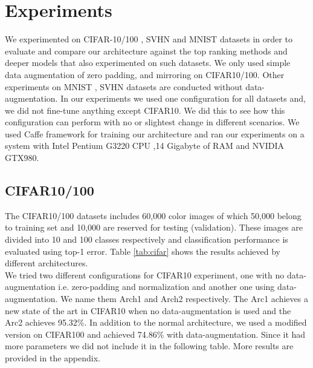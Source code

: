 \documentclass{article} \usepackage{lets_keepit_simple,times}
\begin{document}
\section{Experiments} \label{sec:exp}
We experimented on CIFAR-10/100 \cite{Krizhevsky_LearningMultipleLayers_2009}, SVHN \cite{Netzer_ReadingDigits_2011} and MNIST \cite{Lecun_GradientBased_CNN_1998} datasets in order to evaluate and compare our architecture against the top ranking methods and deeper models that also experimented on such datasets. We only used simple data augmentation of zero padding, and mirroring on CIFAR10/100. Other experiments on MNIST , SVHN datasets are conducted without data-augmentation. In our experiments we used one configuration for all datasets and, we did not fine-tune anything except CIFAR10. We did this to see how this configuration can perform with no or slightest change in different scenarios. We used Caffe framework \cite{Jia_Caffe_2014} for training our architecture and ran our experiments on a system with Intel Pentium G3220 CPU ,14 Gigabyte of RAM and NVIDIA GTX980.  
 
\subsection{CIFAR10/100}
The CIFAR10/100 \cite{Krizhevsky_LearningMultipleLayers_2009} datasets includes 60,000 color images of which 50,000 belong to training set and 10,000 are reserved for testing (validation). These images are divided into 10 and 100 classes respectively and classification performance is evaluated using top-1 error. Table \ref{tab:cifar} shows the results achieved by different architectures.\\ 
We tried two different configurations for CIFAR10 experiment, one with no data-augmentation i.e. zero-padding and normalization and another one using data-augmentation. We name them Arch1 and Arch2 respectively. The Arc1 achieves a new state of the art in CIFAR10 when no data-augmentation is used and the Arc2 achieves 95.32\%. In addition to the normal architecture, we used a modified version on CIFAR100  and achieved 74.86\% with data-augmentation. Since it had more parameters we did not include it in the following table. More results are provided in the appendix. 
\end{document}
